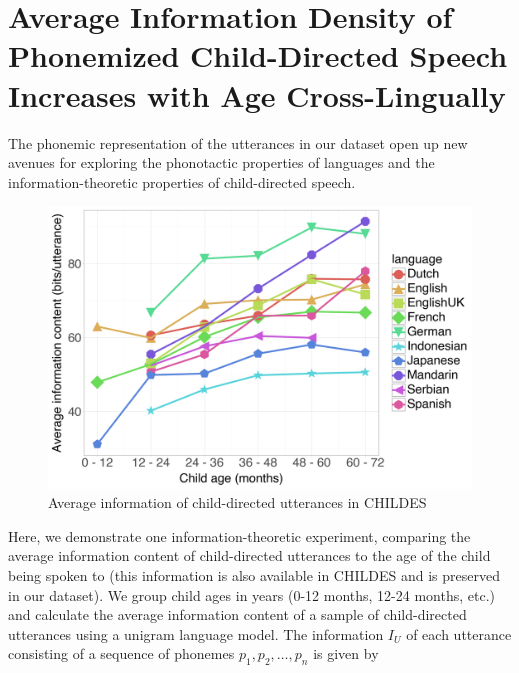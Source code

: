 \section{Average Information Density of Phonemized Child-Directed Speech Increases with Age Cross-Lingually}\label{app:13-parentese}

The phonemic representation of the utterances in our dataset open up new avenues for exploring the phonotactic properties of languages and the information-theoretic properties of child-directed speech. %


\begin{figure}
    \centering
    \includegraphics[width=0.99\linewidth]{Figures/13Dataset/information-trends.png}
    \caption{Average information of child-directed utterances in CHILDES}
    \label{fig:13-information-trends}
\end{figure}

Here, we demonstrate one information-theoretic experiment, comparing the average information content of child-directed utterances to the age of the child being spoken to (this information is also available in CHILDES and is preserved in our dataset). We group child ages in years (0-12 months, 12-24 months, etc.) and calculate the average information content of a sample of child-directed utterances using a unigram language model. The information $I_U$ of each utterance consisting of a sequence of phonemes $p_1,p_2,\ldots,p_n$ is given by

